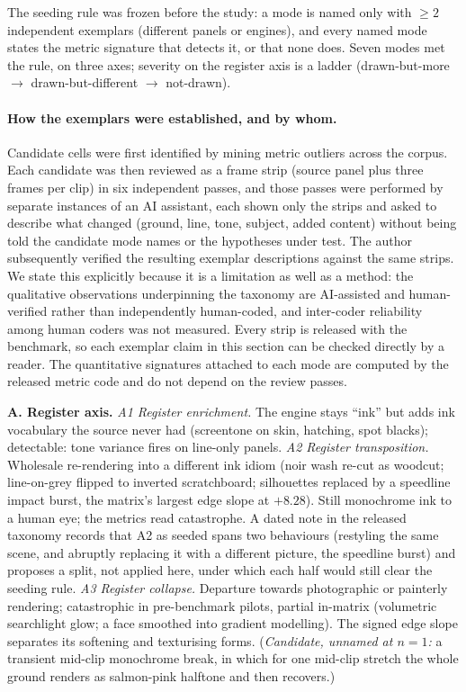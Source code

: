 \documentclass[11pt]{article}
\begin{document}
The seeding rule was frozen before the study: a mode is named only with
$\geq 2$ independent exemplars (different panels or engines), and every
named mode states the metric signature that detects it, or that none
does. Seven modes met the rule, on three axes; severity on the register axis
is a ladder (drawn-but-more $\to$ drawn-but-different $\to$ not-drawn).

\paragraph{How the exemplars were established, and by whom.}
Candidate cells were first identified by mining metric outliers across the
corpus. Each candidate was then reviewed as a frame strip (source panel plus
three frames per clip) in six independent passes, and those passes were
performed by separate instances of an AI assistant, each shown only the
strips and asked to describe what changed (ground, line, tone, subject,
added content) without being told the candidate mode names or the
hypotheses under test. The author subsequently verified the resulting
exemplar descriptions against the same strips. We state this explicitly
because it is a limitation as well as a method: the qualitative observations
underpinning the taxonomy are AI-assisted and human-verified rather than
independently human-coded, and inter-coder reliability among human coders was
not measured. Every strip is released with the benchmark, so each exemplar
claim in this section can be checked directly by a reader. The quantitative
signatures attached to each mode are computed by the released metric code and
do not depend on the review passes.

\textbf{A. Register axis.}
\emph{A1 Register enrichment.} The engine stays ``ink'' but adds ink
vocabulary the source never had (screentone on skin, hatching, spot blacks);
detectable: tone variance fires on line-only panels.
\emph{A2 Register transposition.} Wholesale re-rendering into a different
ink idiom (noir wash re-cut as woodcut; line-on-grey flipped to inverted
scratchboard; silhouettes replaced by a speedline impact burst, the
matrix's largest edge slope at $+8.28$). Still monochrome ink to a human
eye; the metrics read catastrophe. A dated note in the released taxonomy records that A2 as seeded spans two behaviours (restyling the same scene, and abruptly replacing it with a different picture, the speedline burst) and proposes a split, not applied here, under which each half would still clear the seeding rule.
\emph{A3 Register collapse.} Departure towards photographic or painterly
rendering; catastrophic in pre-benchmark pilots, partial in-matrix
(volumetric searchlight glow; a face smoothed into gradient modelling).
The signed edge slope separates its softening and texturising forms.
(\emph{Candidate, unnamed at $n=1$:} a transient mid-clip monochrome break,
in which for one mid-clip stretch the whole ground renders as salmon-pink halftone and then recovers.)
\end{document}
